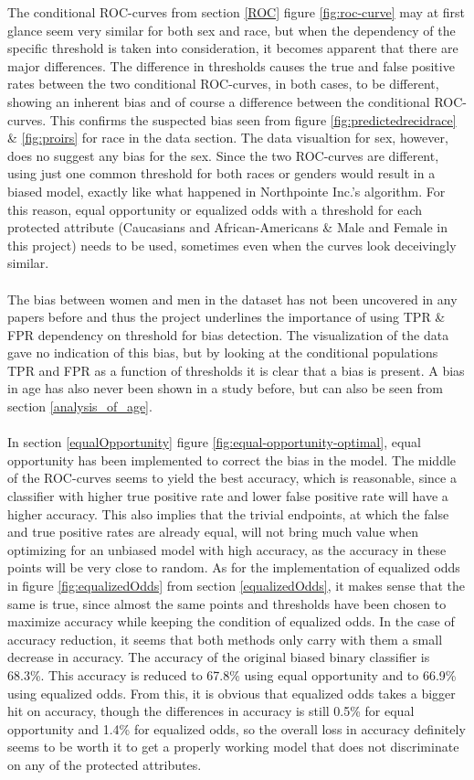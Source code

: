 \documentclass[11pt, fleqn, titlepage]{article}
\begin{document}
	The conditional ROC-curves from section \ref{ROC} figure \ref{fig:roc-curve} may at first glance seem very similar for both sex and race, but when the dependency of the specific threshold is taken into consideration, it becomes apparent that there are major differences. The difference in thresholds causes the true and false positive rates between the two conditional ROC-curves, in both cases, to be different, showing an inherent bias and of course a difference between the conditional ROC-curves. This confirms the suspected bias seen from figure \ref{fig:predictedrecidrace} \& \ref{fig:proirs} for race in the data section. The data visualtion for sex, however, does no suggest any bias for the sex. Since the two ROC-curves are different, using just one common threshold for both races or genders would result in a biased model, exactly like what happened in Northpointe Inc.'s algorithm. For this reason, equal opportunity or equalized odds with a threshold for each protected attribute (Caucasians and African-Americans \& Male and Female in this project) needs to be used, sometimes even when the curves look deceivingly similar. \\\\
	\noindent
	The bias between women and men in the dataset has not been uncovered in any papers before and thus the project underlines the importance of using TPR \& FPR dependency on threshold for bias detection. The visualization of the data gave no indication of this bias, but by looking at the conditional populations TPR and FPR as a function of thresholds it is clear that a bias is present. A bias in age has also never been shown in a study before, but can also be seen from section \ref{analysis_of_age}.\\\\ 
	In section \ref{equalOpportunity} figure \ref{fig:equal-opportunity-optimal}, equal opportunity has been implemented to correct the bias in the model. The middle of the ROC-curves seems to yield the best accuracy, which is reasonable, since a classifier with higher true positive rate and lower false positive rate will have a higher accuracy. This also implies that the trivial endpoints, at which the false and true positive rates are already equal, will not bring much value when optimizing for an unbiased model with high accuracy, as the accuracy in these points will be very close to random. As for the implementation of equalized odds in figure \ref{fig:equalizedOdds} from section \ref{equalizedOdds}, it makes sense that the same is true, since almost the same points and thresholds have been chosen to maximize accuracy while keeping the condition of equalized odds. In the case of accuracy reduction, it seems that both methods only carry with them a small decrease in accuracy. The accuracy of the original biased binary classifier is 68.3\%. This accuracy is reduced to 67.8\% using equal opportunity and to 66.9\% using equalized odds. From this, it is obvious that equalized odds takes a bigger hit on accuracy, though the differences in accuracy is still 0.5\% for equal opportunity and 1.4\% for equalized odds, so the overall loss in accuracy definitely seems to be worth it to get a properly working model that does not discriminate on any of the protected attributes.
	
\end{document}
